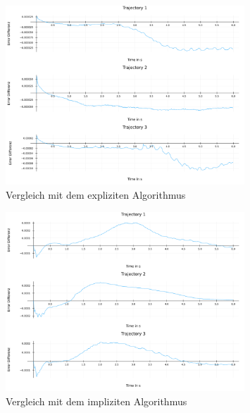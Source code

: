 \begin{figure}[H]
    \centering
    \includegraphics[width=0.8\textwidth]{Data/03_Ergebnisse/autoswitching/errors_explizit_composit.png}
    \caption{Vergleich mit dem expliziten Algorithmus}
    \label{fig:vergleichexplizit}
\end{figure}
\begin{figure}[H]
    \centering
    \includegraphics[width=0.8\textwidth]{Data/03_Ergebnisse/autoswitching/errors_implizit_composit.png}
    \caption{Vergleich mit dem impliziten Algorithmus}
    \label{fig:vergleichimplizit}
\end{figure}

